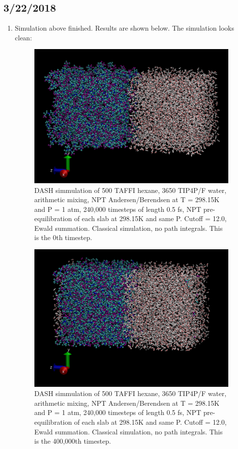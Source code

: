 \documentclass[12pt,reqno]{amsart}
\numberwithin{equation}{section}
\begin{document}
\subsection{3/22/2018}
\begin{enumerate}
\item Simulation above finished.  Results are shown below.  The simulation looks clean: 

\begin{figure}[H]
\centering
\includegraphics[scale=0.4]{dash_taffi-tip4pF_classical_arithmetic_NPT_0}
\caption{DASH simmulation of 500 TAFFI hexane, 3650 TIP4P/F water, arithmetic mixing, NPT Andersen/Berendsen at T = 298.15K and P = 1 atm, 240,000 timesteps of length 0.5 fs, NPT pre-equilibration of each slab at 298.15K and same P.  Cutoff = 12.0, Ewald summation.  Classical simulation, no path integrals.  This is the 0th timestep.}
\end{figure}

\begin{figure}[H]
\centering
\includegraphics[scale=0.4]{dash_taffi-tip4pF_classical_arithmetic_NPT_400000}
\caption{DASH simmulation of 500 TAFFI hexane, 3650 TIP4P/F water, arithmetic mixing, NPT Andersen/Berendsen at T = 298.15K and P = 1 atm, 240,000 timesteps of length 0.5 fs, NPT pre-equilibration of each slab at 298.15K and same P.  Cutoff = 12.0, Ewald summation.  Classical simulation, no path integrals.  This is the 400,000th timestep.}
\end{figure}

\end{enumerate}
\end{document}
